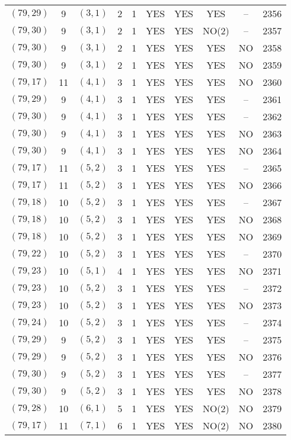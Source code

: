 \begin{longtable}{|c|c|c|c|c|c|c|c|c|c|}
$(79, 29)$ & 9 & $(3, 1)$ & 2 & 1 & YES & YES & YES & -- & 2356\\
$(79, 30)$ & 9 & $(3, 1)$ & 2 & 1 & YES & YES & NO(2) & -- & 2357\\
$(79, 30)$ & 9 & $(3, 1)$ & 2 & 1 & YES & YES & YES & NO & 2358\\
$(79, 30)$ & 9 & $(3, 1)$ & 2 & 1 & YES & YES & YES & NO & 2359\\
$(79, 17)$ & 11 & $(4, 1)$ & 3 & 1 & YES & YES & YES & NO & 2360\\
$(79, 29)$ & 9 & $(4, 1)$ & 3 & 1 & YES & YES & YES & -- & 2361\\
$(79, 30)$ & 9 & $(4, 1)$ & 3 & 1 & YES & YES & YES & -- & 2362\\
$(79, 30)$ & 9 & $(4, 1)$ & 3 & 1 & YES & YES & YES & NO & 2363\\
$(79, 30)$ & 9 & $(4, 1)$ & 3 & 1 & YES & YES & YES & NO & 2364\\
$(79, 17)$ & 11 & $(5, 2)$ & 3 & 1 & YES & YES & YES & -- & 2365\\
$(79, 17)$ & 11 & $(5, 2)$ & 3 & 1 & YES & YES & YES & NO & 2366\\
$(79, 18)$ & 10 & $(5, 2)$ & 3 & 1 & YES & YES & YES & -- & 2367\\
$(79, 18)$ & 10 & $(5, 2)$ & 3 & 1 & YES & YES & YES & NO & 2368\\
$(79, 18)$ & 10 & $(5, 2)$ & 3 & 1 & YES & YES & YES & NO & 2369\\
$(79, 22)$ & 10 & $(5, 2)$ & 3 & 1 & YES & YES & YES & -- & 2370\\
$(79, 23)$ & 10 & $(5, 1)$ & 4 & 1 & YES & YES & YES & NO & 2371\\
$(79, 23)$ & 10 & $(5, 2)$ & 3 & 1 & YES & YES & YES & -- & 2372\\
$(79, 23)$ & 10 & $(5, 2)$ & 3 & 1 & YES & YES & YES & NO & 2373\\
$(79, 24)$ & 10 & $(5, 2)$ & 3 & 1 & YES & YES & YES & -- & 2374\\
$(79, 29)$ & 9 & $(5, 2)$ & 3 & 1 & YES & YES & YES & -- & 2375\\
$(79, 29)$ & 9 & $(5, 2)$ & 3 & 1 & YES & YES & YES & NO & 2376\\
$(79, 30)$ & 9 & $(5, 2)$ & 3 & 1 & YES & YES & YES & -- & 2377\\
$(79, 30)$ & 9 & $(5, 2)$ & 3 & 1 & YES & YES & YES & NO & 2378\\
$(79, 28)$ & 10 & $(6, 1)$ & 5 & 1 & YES & YES & NO(2) & NO & 2379\\
$(79, 17)$ & 11 & $(7, 1)$ & 6 & 1 & YES & YES & NO(2) & NO & 2380\\

\end{longtable}
